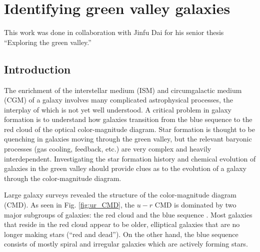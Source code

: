 \chapter[Green valley galaxies]{Identifying green valley galaxies}\label{ch:GV}

This work was done in collaboration with Jinfu Dai for his senior thesis 
``Exploring the green valley.''


\section{Introduction}

The enrichment of the interstellar medium (ISM) and circumgalactic medium (CGM) 
of a galaxy involves many complicated astrophysical processes, the interplay of 
which is not yet well understood.  A critical problem in galaxy formation is to 
understand how galaxies transition from the blue sequence to the red cloud of 
the optical color-magnitude diagram.  Star formation is thought to be quenching 
in galaxies moving through the green valley, but the relevant baryonic processes 
(gas cooling, feedback, etc.) are very complex and heavily interdependent.  
Investigating the star formation history and chemical evolution of galaxies in 
the green valley should provide clues as to the evolution of a galaxy through 
the color-magnitude diagram.



Large galaxy surveys \citep[like the Sloan Digital Sky Survey;][]{York00} 
revealed the structure of the color-magnitude diagram (CMD).  As seen in Fig. 
\ref{fig:ur_CMD}, the $u-r$ CMD is dominated by two major subgroups of galaxies: 
the red cloud and the blue sequence \citep{Strateva01, Baldry04}.  Most galaxies 
that reside in the red cloud appear to be older, elliptical galaxies that are no 
longer making stars (``red and dead'').  On the other hand, the blue sequence 
consists of mostly spiral and irregular galaxies which are actively forming stars.

